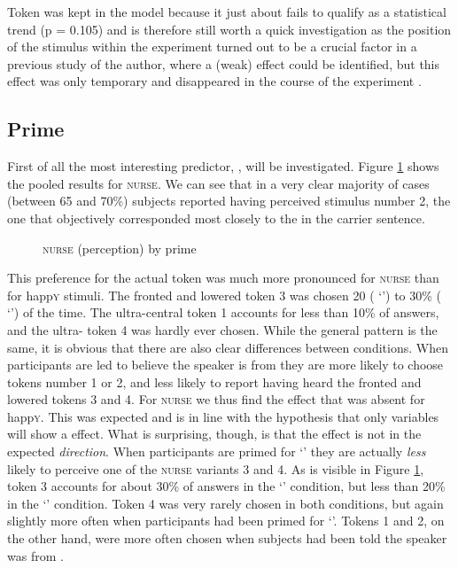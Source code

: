 Token was kept in the model because it just about fails to qualify as a statistical trend (p = 0.105) and is therefore still worth a quick investigation as the position of the stimulus within the experiment turned out to be a crucial factor in a previous study of the author, where a (weak)  effect could be identified, but this effect was only temporary and disappeared in the course of the experiment \parencite[cf.][]{juskanma}.

\subsection{Prime}
\label{sec.perc_res.nurse.prime}

First of all the most interesting predictor, , will be investigated.
Figure \ref{fig.bar.nurse.tot.ext} shows the pooled results for \textsc{nurse}.
We can see that in a very clear majority of cases (between 65 and 70\%) subjects reported having perceived stimulus number 2, the one that objectively corresponded most closely to the  in the carrier sentence.

\begin{figure}[h]
	\centering
		\resizebox{.49\linewidth}{!}{} 
	\caption{\textsc{nurse} (perception) by prime}
	\label{fig.bar.nurse.tot.ext}
\end{figure}

This preference for the actual token was much more pronounced for \textsc{nurse} than for happ\textsc{y} stimuli.
The fronted and lowered token 3 was chosen 20 ( `') to 30\% ( `') of the time.
The ultra-central token 1 accounts for less than 10\% of answers, and the ultra- token 4 was hardly ever chosen.
While the general pattern is the same, it is obvious that there are also clear differences between  conditions.
When participants are led to believe the speaker is from  they are more likely to choose tokens number 1 or 2, and less likely to report having heard the fronted and lowered tokens 3 and 4.
For \textsc{nurse} we thus find the  effect that was absent for happ\textsc{y}.
This was expected and is in line with the hypothesis that only  variables will show a  effect.
What is surprising, though, is that the  effect is not in the expected \emph{direction}.
When participants are primed for `' they are actually \emph{less} likely to perceive one of the  \textsc{nurse} variants 3 and 4.
As is visible in Figure \ref{fig.bar.nurse.tot.ext}, token 3 accounts for about 30\% of answers in the `' condition, but less than 20\% in the `' condition.
Token 4 was very rarely chosen in both conditions, but again slightly more often when participants had been primed for `'.
Tokens 1 and 2, on the other hand, were more often chosen when subjects had been told the speaker was from .

